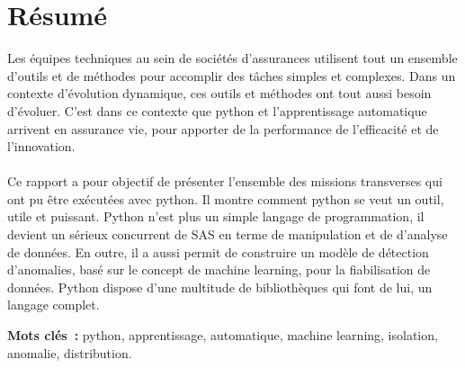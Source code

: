 \chapter*{Résumé} 



Les équipes techniques au sein de sociétés d'assurances utilisent tout un ensemble d'outils et de méthodes pour accomplir des tâches simples et complexes. Dans un contexte d'évolution dynamique, ces outils et méthodes ont tout aussi besoin d'évoluer. C'est dans ce contexte que python et l'apprentissage automatique arrivent en assurance vie, pour apporter de la performance de l'efficacité et de l'innovation. 
\\
\\
Ce rapport a pour objectif de présenter l'ensemble des missions transverses qui ont pu être exécutées avec python. Il montre comment python se veut un outil, utile et puissant. Python n'est plus un simple langage de programmation, il devient un sérieux concurrent de SAS en terme de manipulation et de d'analyse de données. En outre, il a aussi permit de construire un modèle de détection d'anomalies, basé sur le concept de machine learning, pour la fiabilisation de données. Python dispose d'une multitude de bibliothèques qui font de lui, un langage complet.

\begin{singlespace}
\textbf{Mots clés~:} python, apprentissage, automatique, machine learning, isolation, anomalie, distribution.
\end{singlespace}
